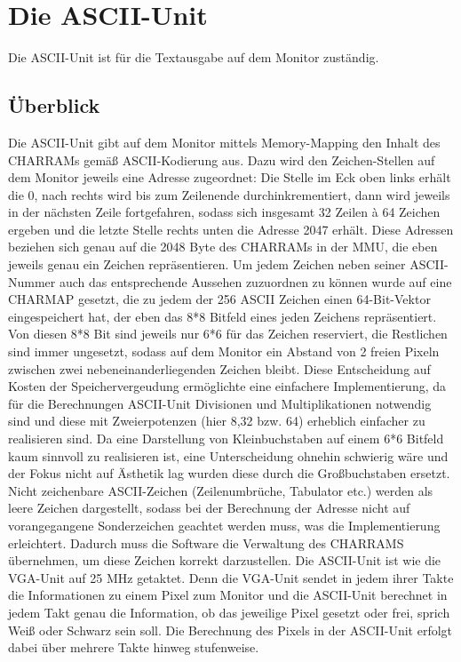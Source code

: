 

\chapter{Die ASCII-Unit}
Die ASCII-Unit ist für die Textausgabe auf dem Monitor zuständig. 
\section{Überblick}
Die ASCII-Unit gibt auf dem Monitor mittels Memory-Mapping den Inhalt des CHARRAMs gemäß ASCII-Kodierung aus. Dazu wird den Zeichen-Stellen auf dem Monitor jeweils eine Adresse zugeordnet: Die Stelle im Eck oben links erhält die 0, nach rechts wird bis zum Zeilenende durchinkrementiert, dann wird jeweils in der nächsten Zeile fortgefahren, sodass sich insgesamt 32 Zeilen à 64 Zeichen ergeben und die letzte Stelle rechts unten die Adresse 2047 erhält. Diese Adressen beziehen sich genau auf die 2048 Byte des CHARRAMs in der MMU, die eben jeweils genau ein Zeichen repräsentieren.
Um jedem Zeichen neben seiner ASCII-Nummer auch das entsprechende Aussehen zuzuordnen zu können wurde auf eine CHARMAP gesetzt, die zu jedem der 256 ASCII Zeichen einen 64-Bit-Vektor eingespeichert hat, der eben das 8*8 Bitfeld eines jeden Zeichens repräsentiert. Von diesen 8*8 Bit sind jeweils nur 6*6 für das Zeichen reserviert, die Restlichen sind immer ungesetzt, sodass auf dem Monitor ein Abstand von 2 freien Pixeln zwischen zwei nebeneinanderliegenden Zeichen bleibt. Diese Entscheidung auf Kosten der Speichervergeudung ermöglichte eine einfachere Implementierung, da für die Berechnungen ASCII-Unit Divisionen und Multiplikationen notwendig sind und diese mit Zweierpotenzen (hier 8,32 bzw. 64) erheblich einfacher zu realisieren sind. 
Da eine Darstellung von Kleinbuchstaben auf einem 6*6 Bitfeld kaum sinnvoll zu realisieren ist, eine Unterscheidung ohnehin schwierig wäre und der Fokus nicht auf Ästhetik lag wurden diese durch die Großbuchstaben ersetzt.
Nicht zeichenbare ASCII-Zeichen (Zeilenumbrüche, Tabulator etc.) werden als leere Zeichen dargestellt, sodass bei der Berechnung der Adresse nicht auf vorangegangene Sonderzeichen geachtet werden muss, was die Implementierung erleichtert. Dadurch muss die Software die Verwaltung des CHARRAMS übernehmen, um diese Zeichen korrekt darzustellen.
Die ASCII-Unit ist wie die VGA-Unit auf 25 MHz getaktet. Denn die VGA-Unit sendet in jedem ihrer Takte die Informationen zu einem Pixel zum Monitor und die ASCII-Unit berechnet in jedem Takt genau die Information, ob das jeweilige Pixel gesetzt oder frei, sprich Weiß oder Schwarz sein soll. Die Berechnung des Pixels in der ASCII-Unit erfolgt dabei über mehrere Takte hinweg stufenweise.


